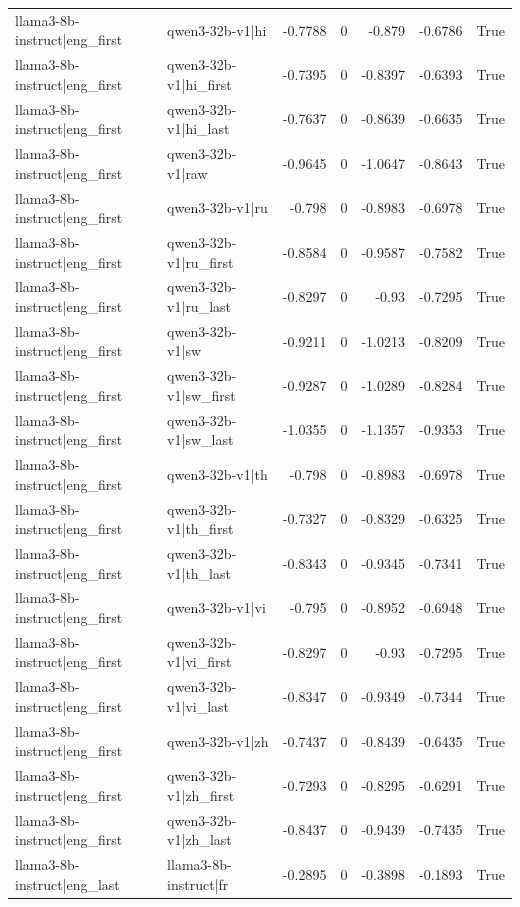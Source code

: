 \begin{table}
\begin{tabular}{l l r r r r l}
llama3-8b-instruct|eng_first & qwen3-32b-v1|hi & -0.7788 & 0 & -0.879 & -0.6786 & True \\
llama3-8b-instruct|eng_first & qwen3-32b-v1|hi_first & -0.7395 & 0 & -0.8397 & -0.6393 & True \\
llama3-8b-instruct|eng_first & qwen3-32b-v1|hi_last & -0.7637 & 0 & -0.8639 & -0.6635 & True \\
llama3-8b-instruct|eng_first & qwen3-32b-v1|raw & -0.9645 & 0 & -1.0647 & -0.8643 & True \\
llama3-8b-instruct|eng_first & qwen3-32b-v1|ru & -0.798 & 0 & -0.8983 & -0.6978 & True \\
llama3-8b-instruct|eng_first & qwen3-32b-v1|ru_first & -0.8584 & 0 & -0.9587 & -0.7582 & True \\
llama3-8b-instruct|eng_first & qwen3-32b-v1|ru_last & -0.8297 & 0 & -0.93 & -0.7295 & True \\
llama3-8b-instruct|eng_first & qwen3-32b-v1|sw & -0.9211 & 0 & -1.0213 & -0.8209 & True \\
llama3-8b-instruct|eng_first & qwen3-32b-v1|sw_first & -0.9287 & 0 & -1.0289 & -0.8284 & True \\
llama3-8b-instruct|eng_first & qwen3-32b-v1|sw_last & -1.0355 & 0 & -1.1357 & -0.9353 & True \\
llama3-8b-instruct|eng_first & qwen3-32b-v1|th & -0.798 & 0 & -0.8983 & -0.6978 & True \\
llama3-8b-instruct|eng_first & qwen3-32b-v1|th_first & -0.7327 & 0 & -0.8329 & -0.6325 & True \\
llama3-8b-instruct|eng_first & qwen3-32b-v1|th_last & -0.8343 & 0 & -0.9345 & -0.7341 & True \\
llama3-8b-instruct|eng_first & qwen3-32b-v1|vi & -0.795 & 0 & -0.8952 & -0.6948 & True \\
llama3-8b-instruct|eng_first & qwen3-32b-v1|vi_first & -0.8297 & 0 & -0.93 & -0.7295 & True \\
llama3-8b-instruct|eng_first & qwen3-32b-v1|vi_last & -0.8347 & 0 & -0.9349 & -0.7344 & True \\
llama3-8b-instruct|eng_first & qwen3-32b-v1|zh & -0.7437 & 0 & -0.8439 & -0.6435 & True \\
llama3-8b-instruct|eng_first & qwen3-32b-v1|zh_first & -0.7293 & 0 & -0.8295 & -0.6291 & True \\
llama3-8b-instruct|eng_first & qwen3-32b-v1|zh_last & -0.8437 & 0 & -0.9439 & -0.7435 & True \\
llama3-8b-instruct|eng_last & llama3-8b-instruct|fr & -0.2895 & 0 & -0.3898 & -0.1893 & True \\

\end{tabular}
\end{table}
